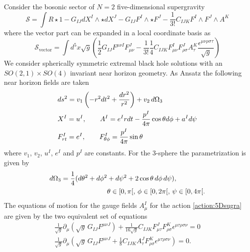 \documentclass[12pt,twoside]{book}
\begin{document}
\begin{appendices}
Consider the bosonic sector of $N=2$ five-dimensional supergravity
\begin{equation}\label{action:5Dsugra}
\mathcal{S}=\int R\star 1 - G_{IJ}dX^{I}\wedge\star dX^{J} - G_{IJ}F^{I}\wedge\star F^{J}-\frac{1}{3!}
C_{IJK}F^{I}\wedge F^{J}\wedge A^{K}
\end{equation}
where the vector part can be expanded in a local coordinate basis as
\begin{equation}\label{action:5Dsugra-vector}
\mathcal{S}_{\mathrm{vector}} = \int d^{5}x\sqrt{g}\left(\frac{1}{2}G_{IJ}F^{\mu\nu I}F^{J}_{\mu\nu}-\frac{1}{3!}
\frac{1}{4}C_{IJK}F^{I}_{\mu\nu}F^{J}_{\rho\sigma}A^{K}_{\tau}\frac{\epsilon^{\mu\nu\rho\sigma\tau}}{\sqrt{g}}\right)
\end{equation}
We consider spherically symmetric extremal black hole solutions with an\linebreak $SO(2,1)\times SO(4)$
invariant near horizon geometry. As Ansatz the following near horizon fields are taken
\begin{align}
& ds^{2} = v_{1} \left( -r^{2}dt^{2} + \frac{dr^{2}}{r^{2}} \right) + v_{2} \, d\Omega_{3} \notag\\
& X^{I} = u^{I}, \qquad A^{I} = e^{I} r dt - \frac{p^{I}}{4\pi}\cos\theta d\phi + a^{I}d\psi \notag\\
& F^{I}_{rt} = e^{I},\qquad F^{I}_{\theta\phi}=\frac{p^{I}}{4\pi}\sin\theta
\label{AnsatzStatic5D}
\end{align}where $v_{1}$, $v_{2}$, ${u^{I}}$, ${e^{I}}$ and $p^{I}$ are constants. For the 3-sphere the parametrization is given by \cite{Gauntlett:fk}
\begin{align}
d\Omega_{3} = \frac{1}{4} ( d\theta^{2} + d\phi^{2} &+ d\psi^{2} +2\cos\theta \, d\phi\, d\psi ) , \\
&\theta \in [0,\pi[, \, \phi \in [0, 2\pi[, \, \psi \in [0, 4\pi[. \notag
\end{align}
The equations of motion for the gauge fields $A^{I}_{\mu}$ for the action \eqref{action:5Dsugra}
are given by the two equivalent set of equations
\begin{gather}
\frac{1}{\sqrt{g}}\partial_{\mu}\left(\sqrt{g} \,G_{IJ}F^{\mu\nu J}\right)+\frac{1}{16\sqrt{g}}
C_{IJK}F^{J}_{\mu\tau}F^{K}_{\rho\sigma}\epsilon^{\mu\tau\rho\sigma\nu}=0\label{eq:Gauge5D1}
\\
\frac{1}{\sqrt{g}}\partial_{\mu}\left(\sqrt{g} \,G_{IJ}F^{\mu\nu J}+\frac{1}{8}
C_{IJK}A^{J}_{\tau}F^{K}_{\rho\sigma}\epsilon^{\mu\tau\rho\sigma\nu}\right)=0\label{eq:Gauge5D2}
.
\end{gather}


\end{appendices}
\end{document}
